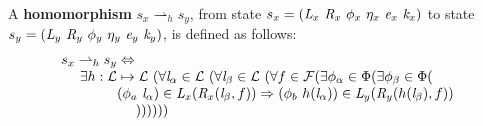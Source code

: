 %
%
%

\begin{definition}
\label{def:homomorphism}
A \textbf{homomorphism} $s_x \rightharpoonup_{h} s_y$, from state $s_x = ( \cfgnt{L}_x\ \cfgnt{R}_x\ \phi_x\ \eta_x\ \cfgnt{e}_x\ \cfgnt{k}_x )$ to state $s_y = ( \cfgnt{L}_y\ \cfgnt{R}_y\ \phi_y\ \eta_y\ \cfgnt{e}_y\ \cfgnt{k}_y )$, is defined as follows: 
$$
\begin{array}{l}
 s_x \rightharpoonup_{h} s_y \Leftrightarrow \\
\ \ \ \ \exists h: \mathcal{L} \mapsto \mathcal{L}\ (\forall \cfgnt{l}_\alpha \in \mathcal{L}\ (\forall \cfgnt{l}_\beta \in \mathcal{L}\ ( \forall f \in \mathcal{F}( \exists \phi_\alpha \in \Phi(\exists \phi_\beta \in \Phi( \\ 
\ \ \ \ \ \ \ \ \ \ \ \ (\phi_a\ \cfgnt{l}_\alpha) \in \cfgnt{L}_x(\cfgnt{R}_x (\cfgnt{l}_\beta,f )) \Rightarrow (\phi_b\ h(\cfgnt{l}_\alpha))\in \cfgnt{L}_y(\cfgnt{R}_y (h(\cfgnt{l}_\beta),f ))\ \\
\ \ \ \ \ \ \ \ \ \ \ \ \ \ \ \  )) ) ) ) )
\end{array}
$$
\end{definition}

